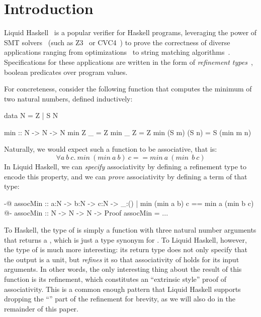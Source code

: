 \section{Introduction}

Liquid Haskell~\cite{liquidHaskell} is a popular verifier for Haskell
programs, leveraging the power of SMT solvers~\cite{BarST-RR-10} (such
as Z3~\cite{Z3} or CVC4~\cite{CVC4}) to prove the correctness of
diverse applications ranging from optimizations~\cite{TPE2018} to
string matching algorithms~\cite{TaleOfTwoProvers}. Specifications for
these applications are written in the form of {\em refinement
  types}~\cite{RefinementForML}, boolean predicates over program
values.

For concreteness, consider the following  function that
computes the minimum of two natural numbers, defined inductively:
\begin{code}
  data N = Z | S N
  
  min :: N -> N -> N 
  min Z _ = Z
  min _ Z = Z
  min (S m) (S n) = S (min m n)
\end{code}

\newcommand{\imin}{\textit{min}~}
Naturally, we would expect such a function to be associative, that is:
$$ \forall a ~ b ~ c. ~ \imin (\imin a~b)~c == \imin a~(\imin~b~c) $$
%
In Liquid Haskell, we can {\em specify} associativity by defining a
refinement type to encode this property, and we can {\em prove}
associativity by defining a term of that type:
%
\begin{code}
  {-@ assocMin :: a:N -> b:N -> c:N ->
      {_:() | min (min a b) c == min a (min b c)}
  @-}
  assocMin :: N -> N -> N -> Proof
  assocMin = ...
\end{code}
%
To Haskell, the type of  is simply a function with three
natural number arguments that returns a , which is just a
type synonym for \LC{()}. To Liquid Haskell, however, the type of
 is much more interesting: its return type does not only
specify that the output is a unit, but {\em refines} it so that
associativity of  holds for its input arguments. In other
words, the only interesting thing about the result of this function is
its refinement, which constitutes an ``extrinsic style'' proof of
associativity. This is a common enough pattern that Liquid Haskell
supports dropping the ``\LC{_:()}'' part of the refinement for
brevity, as we will also do in the remainder of this paper.

